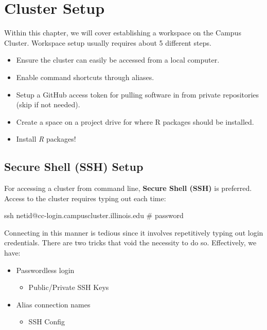 \documentclass[
  letterpaper,
  DIV=11,
  numbers=noendperiod]{scrreport}
\newenvironment{Shaded}{\begin{snugshade}}{\end{snugshade}}
\newcommand{\CommentTok}[1]{\textcolor[rgb]{0.37,0.37,0.37}{#1}}
\newcommand{\FunctionTok}[1]{\textcolor[rgb]{0.28,0.35,0.67}{#1}}
\newcommand{\NormalTok}[1]{\textcolor[rgb]{0.00,0.23,0.31}{#1}}
\providecommand{\tightlist}{%
  \setlength{\itemsep}{0pt}\setlength{\parskip}{0pt}}\usepackage{longtable,booktabs,array}
\begin{document}
\hypertarget{cluster-setup}{%
\chapter{Cluster Setup}\label{cluster-setup}}

Within this chapter, we will cover establishing a workspace on the
Campus Cluster. Workspace setup usually requires about 5 different
steps.

\begin{itemize}
\tightlist
\item
  Ensure the cluster can easily be accessed from a local computer.
\item
  Enable command shortcuts through aliases.
\item
  Setup a GitHub access token for pulling software in from private
  repositories (skip if not needed).
\item
  Create a space on a project drive for where R packages should be
  installed.
\item
  Install \emph{R} packages!
\end{itemize}

\hypertarget{secure-shell-ssh-setup}{%
\section{Secure Shell (SSH) Setup}\label{secure-shell-ssh-setup}}

For accessing a cluster from command line, \textbf{Secure Shell (SSH)}
is preferred. Access to the cluster requires typing out each time:

\begin{Shaded}
\begin{Highlighting}[]
\FunctionTok{ssh}\NormalTok{ netid@cc{-}login.campuscluster.illinois.edu}
\CommentTok{\# password}
\end{Highlighting}
\end{Shaded}

Connecting in this manner is tedious since it involves repetitively
typing out login credentials. There are two tricks that void the
necessity to do so. Effectively, we have:

\begin{itemize}
\tightlist
\item
  Passwordless login

  \begin{itemize}
  \tightlist
  \item
    Public/Private SSH Keys
  \end{itemize}
\item
  Alias connection names

  \begin{itemize}
  \tightlist
  \item
    SSH Config
  \end{itemize}
\end{itemize}
\end{document}
